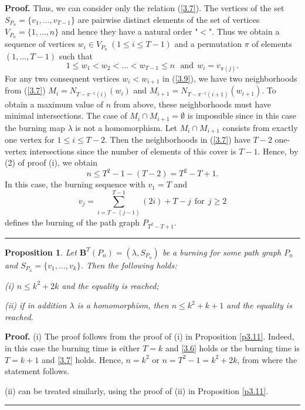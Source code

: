 \documentclass[a4paper, 11pt]{article}
\newtheorem{proposition}[theorem]{Proposition}
\newenvironment{proof}[1][Proof]{\textbf{#1.} }{\ \rule{0.5em}{0.5em}}
\begin{document}
\begin{proof}
Thus,  we can consider only the relation  (\ref{3.7}). 
The vertices  of the set $S_{P_n}=\{v_1, \dots , v_{T-1}\}$ are pairwise distinct  elements of the set of vertices 
$V_{P_{n}}=\{1, \dots , n\}$ and hence they  have a natural  order "$<$". Thus we obtain a sequence of  vertices $w_i \in V_{P_n} \ (1\leq i\leq T-1)$ and a permutation  $\pi$  of elements $(1, \dots, T-1)$ such that 
\begin{equation}\label{3.9}
1\leq w_1< w_2< \dots <w_{T-1}\leq n     \ \ \ \text{and} \ \  w_i=v_{\pi(j)}. 
\end{equation} 
For any two consequent vertices $w_i< w_{i+1}$ in (\ref{3.9}),  we 
have two neighborhoods from (\ref{3.7})
$M_{i}=N_{T-\pi^{-1}(i)}(w_i)$  and $M_{i+1}=N_{T-\pi^{-1}(i+1)}(w_{i+1})$.   To obtain   a maximum value of $n$ from above,  these neighborhoods must have minimal intersections.  The case of $M_{i}\cap M_{i+1}=\emptyset$ is impossible since in this case the burning map $\lambda$  is not a homomorphism.   Let  $M_i\cap M_{i+1}$ consists from  exactly one vertex for $1\leq i\leq T-2$. Then  the neighborhoods in  (\ref{3.7}) have $T-2$ one-vertex intersections since  the number of elements of this cover is $T-1$.  Hence, by (2) of proof  (i), we obtain 
\begin{equation}\label{3.10}
n\le T^2-1-(T-2)=T^2-T+1. 
\end{equation}
In this case, the burning sequence with $v_1=T$ and 
$$
v_j=\sum_{i=T-(j-1)}^{T-1}(2 i)+T-j  \ \ \text{for} \ \  j\ge 2
$$
 defines the burning of the path graph  $P_{T^2-T+1}$.
\end{proof}



\begin{proposition}\label{p3.12}
Let $\mathbf B^T(P_n)=(\lambda, S_{P_n})$ be a burning for some path graph $P_n$ and $S_{P_n}=\{v_1, \dots, v_k\}$. Then the following holds:

 {\rm  (i)}  $n\le k^2+2k$ and  the equality is reached;

{\rm (ii)} if  in addition $\lambda$ is a homomorphism, then $n\le k^2+k+1$ and   the equality is reached.
\end{proposition} 


\begin{proof}
{\rm  (i)} The proof follows from the proof of (i) in Proposition \ref{p3.11}. Indeed, in this case the burning time is either $T=k$ and \eqref{3.6} holds or the burning time is ${T=k+1}$ and \eqref{3.7} holds. Hence, $n=k^2$ or 
$n=T^2-1=k^2+2k$,  from where the statement follows.

{\rm  (ii)} can be treated similarly, using the proof of (ii) in Proposition \ref{p3.11}.
\end{proof}
\end{document}
